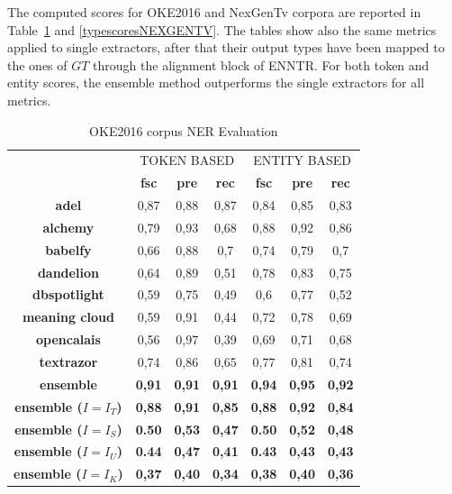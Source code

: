 \documentclass{llncs}
\newcommand{\tabref}[1]{\mbox{Table~\ref{#1}}}
\begin{document}

The computed scores for OKE2016 and NexGenTv corpora are reported in \tabref{typescoresOKE2016} and \ref{typescoresNEXGENTV}. The tables show also the same metrics applied to single extractors, after that their output types have been mapped to the ones of $GT$ through the alignment block of ENNTR. For both token and entity scores, the ensemble method outperforms the single extractors for all metrics.

\begin{table}[p]
    \setlength{\tabcolsep}{12pt}
    \centering
    \begin{tabular}{c|c|c|c|c|c|c|}
      \multicolumn{1}{c}{ } &
      \multicolumn{3}{|c|}{TOKEN BASED} & 
      \multicolumn{3}{|c|}{ENTITY BASED} \\
       \multicolumn{1}{c|}{ } & \textbf{fsc} & \textbf{pre} & \textbf{rec}
       & \textbf{fsc} & \textbf{pre} & \textbf{rec} \\ \hline
        \textbf{adel}            & 0,87   & 0,88   & 0,87 & 0,84  & 0,85  & 0,83 \\ \hline
        \textbf{alchemy}         & 0,79   & 0,93   & 0,68 & 0,88  & 0,92  & 0,86 \\ \hline
        \textbf{babelfy}         & 0,66   & 0,88   & 0,7  & 0,74  & 0,79  & 0,7  \\ \hline
        \textbf{dandelion}       & 0,64   & 0,89   & 0,51 & 0,78  & 0,83  & 0,75 \\ \hline
        \textbf{dbspotlight}     & 0,59   & 0,75   & 0,49 & 0,6   & 0,77  & 0,52 \\ \hline
        \textbf{meaning cloud}   & 0,59   & 0,91   & 0,44 & 0,72  & 0,78  & 0,69 \\ \hline
        \textbf{opencalais}      & 0,56   & 0,97   & 0,39 & 0,69  & 0,71  & 0,68 \\ \hline
        \textbf{textrazor}       & 0,74   & 0,86   & 0,65 & 0,77  & 0,81  & 0,74 \\ \hline \hline
        \textbf{ensemble}        & \textbf{0,91}   & \textbf{0,91}   & \textbf{0,91}  & \textbf{0,94} & \textbf{0,95}  & \textbf{0,92} \\ \hline
       \textbf{ensemble ($I=I_T$)}        & \textbf{0,88}   & \textbf{0,91}   & \textbf{0,85}  & \textbf{0,88} & \textbf{0,92}  & \textbf{0,84} \\\hline
       \textbf{ensemble ($I=I_S$)}        & \textbf{0.50}   & \textbf{0,53}   & \textbf{0,47}  & \textbf{0.50} & \textbf{0,52}  & \textbf{0,48} \\\hline    
       \textbf{ensemble ($I=I_U$)}        & \textbf{0.44}   & \textbf{0,47}   & \textbf{0,41}  & \textbf{0.43} & \textbf{0,43}  & \textbf{0,43} \\\hline
       \textbf{ensemble ($I=I_K$)}        & \textbf{0,37}   & \textbf{0,40}   & \textbf{0,34}  & \textbf{0,38} & \textbf{0,40}  & \textbf{0,36} \\\hline    
    \end{tabular}
    \caption{OKE2016 corpus NER Evaluation}
    \label{typescoresOKE2016}
\end{table}
\end{document}
